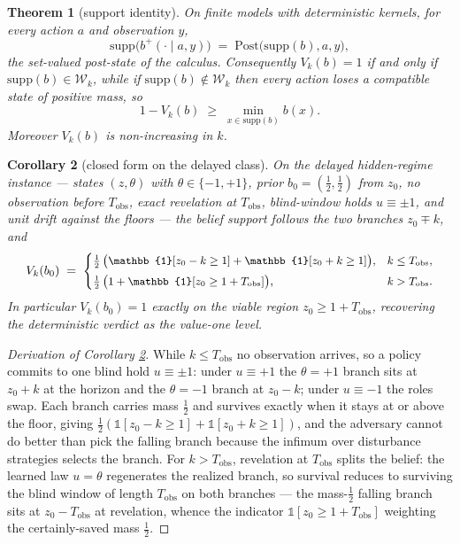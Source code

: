 \documentclass[10pt,twocolumn]{article}
\theoremstyle{plain}
\newtheorem{theorem}{Theorem}
\newtheorem{corollary}[theorem]{Corollary}
\theoremstyle{definition}
\theoremstyle{remark}
\begin{document}
\begin{theorem}[support identity]\label{thm:support}
On finite models with deterministic kernels, for every action \(a\) and
observation \(y\),
\[
\mathrm{supp}\bigl(b^{+}(\cdot \mid a, y)\bigr)
\;=\; \mathrm{Post}\bigl(\mathrm{supp}(b), a, y\bigr),
\]
the set-valued post-state of the calculus. Consequently
\(V_{k}(b) = 1\) if and only if
\(\mathrm{supp}(b) \in \mathcal{W}_{k}\), while if
\(\mathrm{supp}(b) \notin \mathcal{W}_{k}\) then every action loses a
compatible state of positive mass, so
\[
1 - V_{k}(b) \;\ge\; \min_{x \in \mathrm{supp}(b)} b(x).
\]
Moreover \(V_{k}(b)\) is non-increasing in \(k\).
\end{theorem}

\begin{corollary}[closed form on the delayed class]\label{cor:closed}
On the delayed hidden-regime instance --- states \((z, \theta)\) with
\(\theta \in \{-1, +1\}\), prior \(b_{0} = (\tfrac{1}{2}, \tfrac{1}{2})\)
from \(z_{0}\), no observation before \(T_{\mathrm{obs}}\), exact
revelation at \(T_{\mathrm{obs}}\), blind-window holds
\(u \equiv \pm 1\), and unit drift against the floors --- the belief
support follows the two branches \(z_{0} \mp k\), and
\[
\small
V_{k}(b_{0}) \;=\;
\begin{cases}
\tfrac{1}{2}\,\bigl(\mathbb{1}[z_{0} - k \ge 1] + \mathbb{1}[z_{0} + k \ge 1]\bigr), & k \le T_{\mathrm{obs}},\\[1ex]
\tfrac{1}{2}\,\bigl(1 + \mathbb{1}[z_{0} \ge 1 + T_{\mathrm{obs}}]\bigr), & k > T_{\mathrm{obs}}.
\end{cases}
\]
In particular \(V_{k}(b_{0}) = 1\) exactly on the viable region
\(z_{0} \ge 1 + T_{\mathrm{obs}}\), recovering the deterministic verdict
as the value-one level.
\end{corollary}

\begin{proof}[Derivation of Corollary \ref{cor:closed}]
While \(k \le T_{\mathrm{obs}}\) no observation arrives, so a policy
commits to one blind hold \(u \equiv \pm1\): under \(u \equiv +1\) the
\(\theta = +1\) branch sits at \(z_{0} + k\) at the horizon and the
\(\theta = -1\) branch at \(z_{0} - k\); under \(u \equiv -1\) the roles
swap. Each branch carries mass \(\tfrac{1}{2}\) and survives exactly when
it stays at or above the floor, giving
\(\tfrac{1}{2}(\mathbb{1}[z_{0} - k \ge 1] + \mathbb{1}[z_{0} + k \ge 1])\),
and the adversary cannot do better than pick the falling branch because
the infimum over disturbance strategies selects the branch.
For \(k > T_{\mathrm{obs}}\), revelation at \(T_{\mathrm{obs}}\) splits
the belief: the learned law \(u = \theta\) regenerates the realized
branch, so survival reduces to surviving the blind window of length
\(T_{\mathrm{obs}}\) on both branches --- the mass-\(\tfrac12\) falling
branch sits at \(z_{0} - T_{\mathrm{obs}}\) at revelation, whence the
indicator \(\mathbb{1}[z_{0} \ge 1 + T_{\mathrm{obs}}]\) weighting the
certainly-saved mass \(\tfrac{1}{2}\).
\end{proof}
\end{document}
